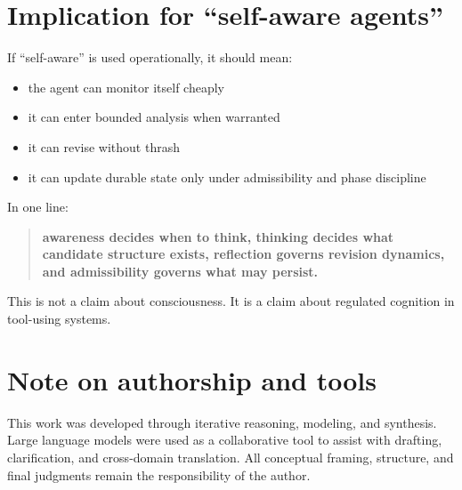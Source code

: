 \documentclass[11pt]{article}
\begin{document}
\section{Implication for \enquote{self-aware agents}}
If \enquote{self-aware} is used operationally, it should mean:
\begin{itemize}[leftmargin=2em]
  \item the agent can monitor itself cheaply
  \item it can enter bounded analysis when warranted
  \item it can revise without thrash
  \item it can update durable state only under admissibility and phase discipline
\end{itemize}

In one line:

\begin{quote}
\textbf{awareness decides when to think, thinking decides what candidate structure exists, reflection governs revision dynamics, and admissibility governs what may persist.}
\end{quote}

This is not a claim about consciousness. It is a claim about regulated cognition in tool-using systems.

\clearpage
\section*{Note on authorship and tools}
This work was developed through iterative reasoning, modeling, and synthesis. Large language models were used as a collaborative tool to assist with drafting, clarification, and cross-domain translation. All conceptual framing, structure, and final judgments remain the responsibility of the author.
\end{document}

